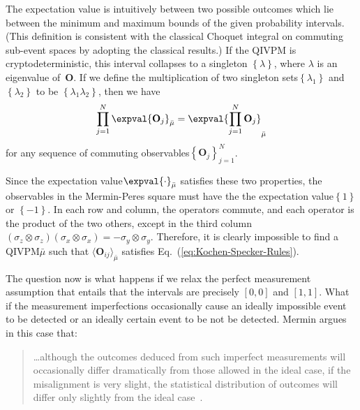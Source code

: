 \documentclass[english,reprint, aps, prl,superscriptaddress, showpacs,
showkeys, longbibliography, amsmath, amssymb]{revtex4-1}
\theoremstyle{plain}
\theoremstyle{definition}
\newcommand{\nb}{\nolinebreak[1] }
\begin{document}
The expectation value is intuitively between two possible outcomes
which lie between the minimum and maximum bounds of the given
probability intervals. (This definition is consistent with the
classical Choquet integral on commuting sub-event spaces by adopting
the classical
results\nb\cite{GilboaSchmeidler1994,Grabisch2016}.)
If the QIVPM is cryptodeterministic, this interval collapses to a
singleton $\left\{ \lambda\right\} $, where $\lambda$ is an eigenvalue
of~$\mathbf{O}$. If we define the multiplication of two singleton
sets\nb$\left\{ \lambda_{1}\right\} $ and
$\left\{ \lambda_{2}\right\} $ to be
$\left\{ \lambda_{1}\lambda_{2}\right\} $, then we have
\begin{equation}
\prod_{j=1}^{N}\expval{\mathbf{O}_{j}}_{\bar{\mu}}=\expval{\prod_{j=1}^{N}\mathbf{O}_{j}}_{\bar{\mu}}\label{eq:Kochen-Specker-Rules}
\end{equation}
for any sequence of commuting observables\nb$\left\{ \mathbf{O}_{j}\right\} _{j=1}^{N}$.

Since the expectation value\nb$\expval{\cdot}_{\bar{\mu}}$ satisfies
these two properties, the observables in the Mermin-Peres square must
have the the expectation value\nb$\left\{ 1\right\} $ or
$\left\{ -1\right\} $.  In each row and column, the operators commute,
and each operator is the product of the two others, except in the
third column
$\left(\sigma_{z}\otimes\sigma_{z}\right)\left(\sigma_{x}\otimes\sigma_{x}\right)=-\sigma_{y}\otimes\sigma_{y}$.
Therefore, it is clearly impossible to find a QIVPM\nb$\bar{\mu}$ such
that $\langle \mathbf{O}_{ij}\rangle_{\bar \mu}$
satisfies Eq.~(\ref{eq:Kochen-Specker-Rules}).

The question now is what happens if we relax the perfect measurement
assumption that entails that the intervals are precisely $[0,0]$ and
$[1,1]$. What if the measurement imperfections occasionally cause an
ideally impossible event to be detected or an ideally certain event to
be not be detected. Mermin argues in this case that:
\begin{quote}
  \ldots although the outcomes deduced from such imperfect
  measurements will occasionally differ dramatically from those
  allowed in the ideal case, if the misalignment is very slight, the
  statistical distribution of outcomes will differ only slightly from
  the ideal case~\citep{Mermin1999}.
\end{quote}
\end{document}
